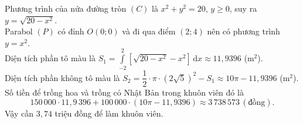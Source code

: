 \begin{ex}
{\begin{center}
\begin{tikzpicture}[scale=0.8, font=\footnotesize, line join=round, line cap=round, >=stealth]
\end{tikzpicture}
\end{center}
Phương trình của nửa đường tròn $(C)$ là $x^2+y^2=20$, $y\geqslant0$, suy ra $y=\sqrt{20-x^2}$.\\
Parabol $(P)$ có đỉnh $O(0;0)$ và đi qua điểm $(2;4)$ nên có phương trình $y=x^2$.\\
Diện tích phần tô màu là $S_1=\displaystyle\int\limits_{-2}^2 \left[\sqrt{20-x^2}-x^2\right]\mathrm{\,d}x\approx11{,}9396$ (m$^2$). \\
Diện tích phần không tô màu là $S_2=\dfrac{1}{2}\cdot\pi\cdot\left(2\sqrt{5}\right)^2-S_1\approx10\pi-11{,}9396$ (m$^2$). \\
Số tiền để trồng hoa và trồng cỏ Nhật Bản trong khuôn viên đó là
\[150\,000\cdot11{,}9\,396+100\,000\cdot\left(10\pi -11{,}9396\right)\approx3\,738\,573\,\left(\text{đồng}\right).\]
Vậy cần $3{,}74$ triệu đồng để làm khuôn viên.
}
\end{ex}

